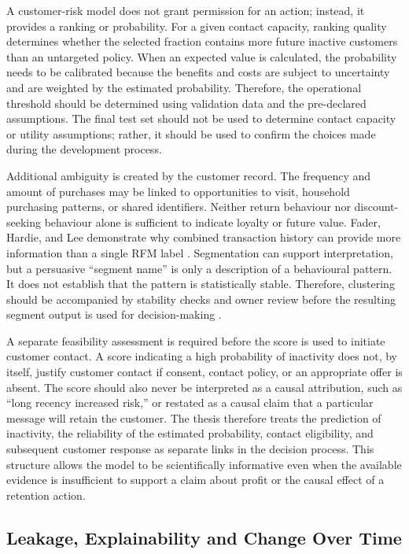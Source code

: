 \documentclass[a4paper,11pt,oneside]{book}
\theoremstyle{plain}
\theoremstyle{definition}
\theoremstyle{remark}
\begin{document}
A customer-risk model does not grant permission for an action; instead, it provides a ranking or probability. For a given contact capacity, ranking quality determines whether the selected fraction contains more future inactive customers than an untargeted policy. When an expected value is calculated, the probability needs to be calibrated because the benefits and costs are subject to uncertainty and are weighted by the estimated probability. Therefore, the operational threshold should be determined using validation data and the pre-declared assumptions. The final test set should not be used to determine contact capacity or utility assumptions; rather, it should be used to confirm the choices made during the development process.

Additional ambiguity is created by the customer record. The frequency and amount of purchases may be linked to opportunities to visit, household purchasing patterns, or shared identifiers. Neither return behaviour nor discount-seeking behaviour alone is sufficient to indicate loyalty or future value. Fader, Hardie, and Lee demonstrate why combined transaction history can provide more information than a single RFM label \cite{fader2005rfm}. Segmentation can support interpretation, but a persuasive ``segment name'' is only a description of a behavioural pattern. It does not establish that the pattern is statistically stable. Therefore, clustering should be accompanied by stability checks and owner review before the resulting segment output is used for decision-making \cite{rousseeuw1987silhouettes}.

A separate feasibility assessment is required before the score is used to initiate customer contact. A score indicating a high probability of inactivity does not, by itself, justify customer contact if consent, contact policy, or an appropriate offer is absent. The score should also never be interpreted as a causal attribution, such as ``long recency increased risk,'' or restated as a causal claim that a particular message will retain the customer. The thesis therefore treats the prediction of inactivity, the reliability of the estimated probability, contact eligibility, and subsequent customer response as separate links in the decision process. This structure allows the model to be scientifically informative even when the available evidence is insufficient to support a claim about profit or the causal effect of a retention action.


\subsection{Leakage, Explainability and Change Over Time}
\end{document}
